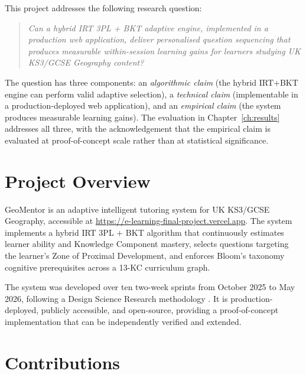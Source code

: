 This project addresses the following research question:

\begin{quote}
\textit{Can a hybrid IRT 3PL + BKT adaptive engine, implemented in a
production web application, deliver personalised question sequencing that
produces measurable within-session learning gains for learners studying
UK KS3/GCSE Geography content?}
\end{quote}

The question has three components: an \textit{algorithmic claim} (the hybrid
IRT+BKT engine can perform valid adaptive selection), a \textit{technical
claim} (implementable in a production-deployed web application), and an
\textit{empirical claim} (the system produces measurable learning gains).
The evaluation in Chapter~\ref{ch:results} addresses all three, with the
acknowledgement that the empirical claim is evaluated at proof-of-concept
scale rather than at statistical significance.

\section{Project Overview}
\label{sec:intro_overview}

GeoMentor is an adaptive intelligent tutoring system for UK KS3/GCSE
Geography, accessible at \url{https://e-learning-final-project.vercel.app}.
The system implements a hybrid IRT 3PL + BKT algorithm that continuously
estimates learner ability and Knowledge Component mastery, selects questions
targeting the learner's Zone of Proximal Development, and enforces Bloom's
taxonomy cognitive prerequisites across a 13-KC curriculum graph.

The system was developed over ten two-week sprints from October 2025 to
May 2026, following a Design Science Research methodology \parencite{hevner2004}.
It is production-deployed, publicly accessible, and open-source, providing a
proof-of-concept implementation that can be independently verified and extended.

\section{Contributions}
\label{sec:intro_contributions}

